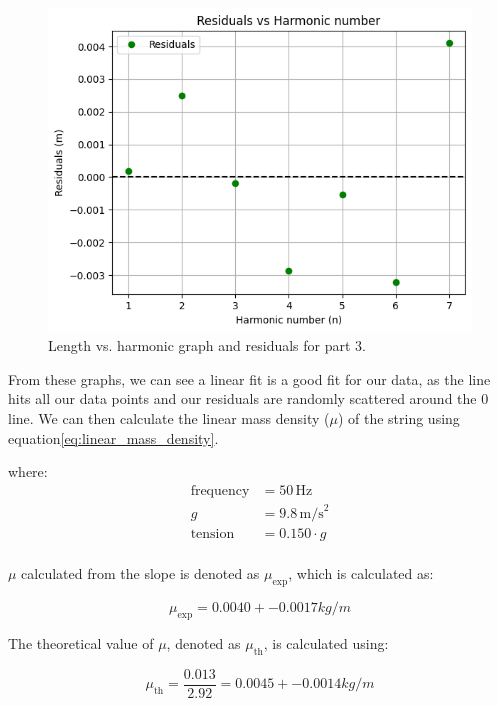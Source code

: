\documentclass[11pt]{article}
\begin{document}
    \begin{figure}[H]
        \includegraphics[width=1\textwidth]{resources/images/p3 residuals}
        \caption{Length vs. harmonic graph and residuals for part 3.}
        \label{fig:measured_length_residuals}
    \end{figure}

    From these graphs, we can see a linear fit is a good fit for our data, as the line hits all our data points and our residuals are randomly scattered around the 0 line.
    We can then calculate the linear mass density ($\mu$) of the string using equation\ref{eq:linear_mass_density}.
    
    where:
    \begin{align*}
    \text{frequency} &= 50 \, \text{Hz} \\
    g &= 9.8 \, \text{m/s}^2 \\
    \text{tension} &= 0.150 \cdot g\\
    \end{align*}
    
    $\mu$ calculated from the slope is denoted as $\mu_{\text{exp}}$, which is calculated as:
    
    \begin{equation}
    \mu_{\text{exp}} = 0.0040 +- 0.0017 kg/m
    \end{equation}
    
    The theoretical value of $\mu$, denoted as $\mu_{\text{th}}$, is calculated using:
    
    \begin{equation}
    \mu_{\text{th}} = \frac{0.013}{2.92} = 0.0045 +- 0.0014 kg/m
    \end{equation}
\end{document}
